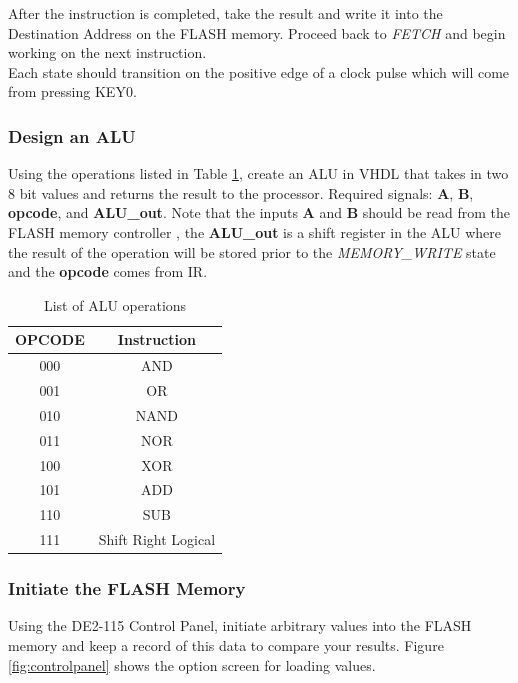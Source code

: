 After the instruction is completed, take the result and write it into the Destination Address on the FLASH memory. Proceed back to \emph{FETCH} and begin working on the next instruction. \\

Each state should transition on the positive edge of a clock pulse which will come from pressing KEY0.

\subsubsection{Design an ALU}
Using the operations listed in Table \ref{tab:aluop}, create an ALU in VHDL that takes in two 8 bit values and returns the result to the processor. Required signals: {\bf A}, {\bf B}, {\bf opcode}, and {\bf ALU\_out}. Note that the inputs {\bf A} and {\bf B} should be read from the FLASH memory controller , the {\bf ALU\_out} is a shift register in the ALU   where the result of the operation will be stored prior to the \emph{MEMORY\_WRITE} state and the {\bf opcode} comes from IR.

\begin {table}[H]
	\caption {List of ALU operations} 
	\label{tab:aluop} 
	\begin{center}
    		\begin{tabular}{ | c | c |}
			\hline
 			{\bf OPCODE} & {\bf Instruction} \\ \hline
			000 & AND \\ \hline
			001 & OR \\ \hline
			010 & NAND \\ \hline
			011 & NOR \\ \hline
			100 & XOR \\ \hline
			101 & ADD \\ \hline
			110 & SUB \\ \hline
			111 & Shift Right Logical \\
			\hline
    		\end{tabular}
	\end{center}
\end{table}

\subsubsection{Initiate the FLASH Memory}

Using the DE2-115 Control Panel, initiate arbitrary values into the FLASH memory and keep a record of this data to compare your results. Figure \ref{fig:controlpanel} shows the option screen for loading values. 

